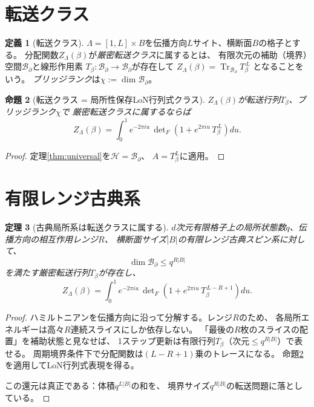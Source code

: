 \documentclass[12pt]{article}
\theoremstyle{plain}
\newtheorem{theorem}{定理}[section]
\newtheorem{proposition}[theorem]{命題}
\theoremstyle{definition}
\newtheorem{definition}[theorem]{定義}
\numberwithin{equation}{section}
\DeclareMathOperator{\Tr}{Tr}
\begin{document}
\section{転送クラス}\label{sec:transfer}

\begin{definition}[転送クラス]\label{def:transfer}
$\Lambda=[1,L]\times B$を伝播方向$L$サイト、横断面$B$の格子とする。
分配関数$Z_\Lambda(\beta)$が\emph{厳密転送クラス}に属するとは、
有限次元の補助（境界）空間$\mathcal{B}_\partial$と線形作用素
$T_\beta:\mathcal{B}_\partial\to\mathcal{B}_\partial$が存在して
$Z_\Lambda(\beta) = \Tr_{\mathcal{B}_\partial}T_\beta^{\,L}$
となることをいう。
\emph{ブリッジランク}は$\chi:=\dim\mathcal{B}_\partial$。
\end{definition}

\begin{proposition}[転送クラス = 局所性保存LoN行列式クラス]\label{prop:transferLoN}
$Z_\Lambda(\beta)$が転送行列$T_\beta$、ブリッジランク$\chi$で
厳密転送クラスに属するならば
\begin{equation}
\boxed{Z_\Lambda(\beta)
= \int_0^1 e^{-2\pi iu}\,
\det\nolimits_F\!\left(1+e^{2\pi iu}\,T_\beta^{\,L}\right)du.}
\end{equation}
\end{proposition}

\begin{proof}
定理\ref{thm:universal}を$\mathcal{H}=\mathcal{B}_\partial$、
$A=T_\beta^L$に適用。
\end{proof}


\section{有限レンジ古典系}\label{sec:classical}

\begin{theorem}[古典局所系は転送クラスに属する]\label{thm:classical}
$d$次元有限格子上の局所状態数$q$、伝播方向の相互作用レンジ$R$、
横断面サイズ$|B|$の有限レンジ古典スピン系に対して、
\begin{equation}
\dim\mathcal{B}_\partial \leq q^{R|B|}
\end{equation}
を満たす厳密転送行列$T_\beta$が存在し、
\begin{equation}
\boxed{Z_\Lambda(\beta) = \int_0^1 e^{-2\pi iu}\,
\det\nolimits_F\!\left(1+e^{2\pi iu}\,T_\beta^{\,L-R+1}\right)du.}
\end{equation}
\end{theorem}

\begin{proof}
ハミルトニアンを伝播方向に沿って分解する。レンジ$R$のため、
各局所エネルギーは高々$R$連続スライスにしか依存しない。
「最後の$R$枚のスライスの配置」を補助状態と見なせば、
1ステップ更新は有限行列$T_\beta$（次元$\leq q^{R|B|}$）で表せる。
周期境界条件下で分配関数は$(L-R+1)$乗のトレースになる。
命題\ref{prop:transferLoN}を適用してLoN行列式表現を得る。

この還元は真正である：体積$q^{L|B|}$の和を、
境界サイズ$q^{R|B|}$の転送問題に落としている。
\end{proof}
\end{document}
